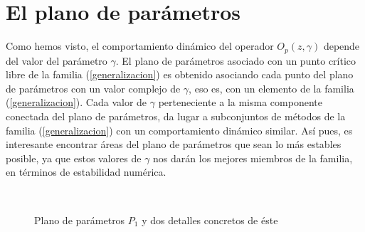 
\section{El plano de parámetros}

Como hemos visto, el comportamiento dinámico del operador $O_p(z,\gamma)$ depende del valor del parámetro $\gamma$. El plano de parámetros asociado con un punto crítico libre de la familia (\ref{generalizacion}) es obtenido asociando cada punto del plano de parámetros con un valor complejo de $\gamma$, eso es, con un elemento de la familia (\ref{generalizacion}). Cada valor de $\gamma$ perteneciente a la misma componente conectada del plano de parámetros, da lugar a subconjuntos de métodos de la familia (\ref{generalizacion}) con un comportamiento dinámico similar. Así pues, es interesante encontrar áreas del plano de parámetros que sean lo más estables posible, ya que estos valores de $\gamma$ nos darán los mejores miembros de la familia, en términos de estabilidad numérica.

\begin{figure}[h!!!]
	\centering
	\\
	\caption{Plano de parámetros $P_1$ y dos detalles concretos de éste}
	\label{planopar1}
\end{figure}

